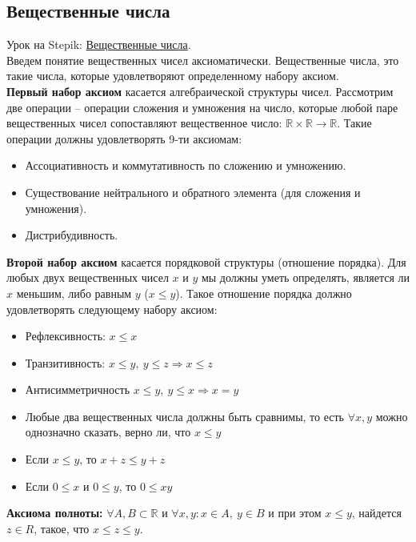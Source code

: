 \documentclass{article}
\begin{document}
\subsection{Вещественные числа}

Урок на Stepik: \href{https://stepik.org/lesson/28445/step/3?unit=9589}{Вещественные числа}. \\

Введем понятие вещественных чисел аксиоматически. Вещественные числа, это такие числа, которые удовлетворяют определенному набору аксиом. \\

\textbf{Первый набор аксиом} касается алгебраической структуры чисел. Рассмотрим две операции -- операции сложения и умножения на число, которые любой паре вещественных чисел сопоставляют вещественное число: $\mathbb{R} \times \mathbb{R} \to \mathbb{R}$. Такие операции должны удовлетворять 9-ти аксиомам:

\begin{itemize}
	\item Ассоциативность и коммутативность по сложению и умножению.
	\item Существование нейтрального и обратного элемента (для сложения и умножения).
	\item Дистрибудивность.
\end{itemize}

\textbf{Второй набор аксиом} касается порядковой структуры (отношение порядка). Для любых двух вещественных чисел $x$ и $y$ мы должны уметь определять, является ли $x$ меньшим, либо равным $y$ ($x \le y$). Такое отношение порядка должно удовлетворять следующему набору аксиом:

\begin{itemize}
	\item Рефлексивность: $x \le x$
	\item Транзитивность: $x \le y, \ y \le z \Rightarrow x \le z$
	\item Антисимметричность $x \le y, \ y \le x \Rightarrow x = y$
	\item Любые два вещественных числа должны быть сравнимы, то есть $\forall x, y$ можно однозначно сказать, верно ли, что $x \le y$
	\item Если $x \le y$, то $x + z \le y + z$
	\item Если $0 \le x$ и $0 \le y$, то $0 \le xy$
\end{itemize}

\textbf{Аксиома полноты:} $\forall A, B \subset \mathbb{R}$ и $\forall x,y: x \in A, \ y \in B$ и при этом $x \le y$, найдется $z \in R$, такое, что $x \le z \le y$.
\end{document}
